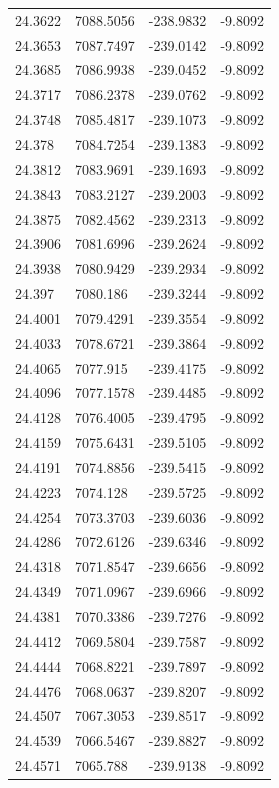 \begin{table}[H]
\begin{tabular}{llll}
24.3622 & 7088.5056 & -238.9832 & -9.8092 \\
24.3653 & 7087.7497 & -239.0142 & -9.8092 \\
24.3685 & 7086.9938 & -239.0452 & -9.8092 \\
24.3717 & 7086.2378 & -239.0762 & -9.8092 \\
24.3748 & 7085.4817 & -239.1073 & -9.8092 \\
24.378 & 7084.7254 & -239.1383 & -9.8092 \\
24.3812 & 7083.9691 & -239.1693 & -9.8092 \\
24.3843 & 7083.2127 & -239.2003 & -9.8092 \\
24.3875 & 7082.4562 & -239.2313 & -9.8092 \\
24.3906 & 7081.6996 & -239.2624 & -9.8092 \\
24.3938 & 7080.9429 & -239.2934 & -9.8092 \\
24.397 & 7080.186 & -239.3244 & -9.8092 \\
24.4001 & 7079.4291 & -239.3554 & -9.8092 \\
24.4033 & 7078.6721 & -239.3864 & -9.8092 \\
24.4065 & 7077.915 & -239.4175 & -9.8092 \\
24.4096 & 7077.1578 & -239.4485 & -9.8092 \\
24.4128 & 7076.4005 & -239.4795 & -9.8092 \\
24.4159 & 7075.6431 & -239.5105 & -9.8092 \\
24.4191 & 7074.8856 & -239.5415 & -9.8092 \\
24.4223 & 7074.128 & -239.5725 & -9.8092 \\
24.4254 & 7073.3703 & -239.6036 & -9.8092 \\
24.4286 & 7072.6126 & -239.6346 & -9.8092 \\
24.4318 & 7071.8547 & -239.6656 & -9.8092 \\
24.4349 & 7071.0967 & -239.6966 & -9.8092 \\
24.4381 & 7070.3386 & -239.7276 & -9.8092 \\
24.4412 & 7069.5804 & -239.7587 & -9.8092 \\
24.4444 & 7068.8221 & -239.7897 & -9.8092 \\
24.4476 & 7068.0637 & -239.8207 & -9.8092 \\
24.4507 & 7067.3053 & -239.8517 & -9.8092 \\
24.4539 & 7066.5467 & -239.8827 & -9.8092 \\
24.4571 & 7065.788 & -239.9138 & -9.8092 \\

\end{tabular}
\end{table}
